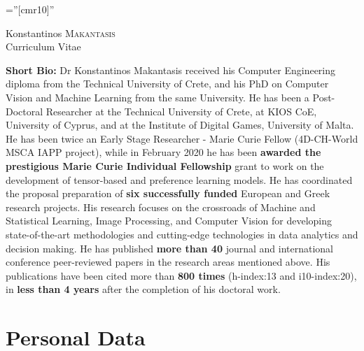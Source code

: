 \documentclass[a4paper,10pt]{article}
\begin{document}

\pagestyle{fancy} %

\font\fb=''[cmr10]'' %

\par{\centering
		{\Huge Konstantinos \textsc{Makantasis} \\ \vspace{0.1in} \Large Curriculum Vitae
	}\bigskip\par}


\textbf{Short Bio:} Dr Konstantinos Makantasis received his Computer Engineering diploma from the Technical University of Crete, and his PhD on Computer Vision and Machine Learning from the same University. He has been a Post-Doctoral Researcher at the Technical University of Crete, at KIOS CoE, University of Cyprus, and at the Institute of Digital Games, University of Malta. He has been twice an Early Stage Researcher - Marie Curie Fellow (4D-CH-World MSCA IAPP project), while in February 2020 he has been \textbf{awarded the prestigious Marie Curie Individual Fellowship} grant to work on the development of tensor-based and preference learning models. He has coordinated the proposal preparation of \textbf{six successfully funded} European and Greek research projects. His research focuses on the crossroads of Machine and Statistical Learning, Image Processing, and Computer Vision for developing state-of-the-art methodologies and cutting-edge technologies in data analytics and decision making. He has published \textbf{more than 40} journal and international conference peer-reviewed papers in the research areas mentioned above. His publications have been cited more than \textbf{800 times} (h-index:13 and i10-index:20), in \textbf{less than 4 years} after the completion of his doctoral work. 


\section{Personal Data}
\end{document}
